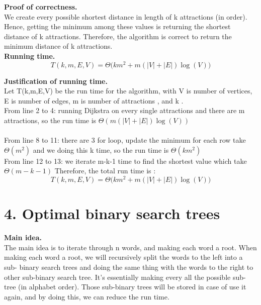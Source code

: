\documentclass[11pt]{article}
\begin{document}
\noindent
\textbf{Proof of correctness.}\\
We create every possible shortest distance in length of k attractions (in order). Hence, getting the minimum among these values is returning the shortest distance of k attractions. Therefore, the algorithm is correct to return the minimum distance of k attractions.\\
\noindent
\textbf{Running time.}
$$\boxed{T(k,m,E,V) = \Theta\Big(km^2 + m(|V| + |E|)\log(V)\Big)}$$

\noindent
\textbf{Justification of running time.}\\
Let T(k,m,E,V) be the run time for the algorithm, with V is number of vertices, E is number of edges, m is number of attractions , and k .\\
From line 2 to 4: running Dijkstra on every single attractions and there are m attractions, so the run time is $\Theta(m(|V| + |E|)\log(V))$\\
\\
From line 8 to 11: there are 3 for loop, update the minimum for each row take $\Theta(m^2)$ and we doing this k time, so the run time is $\Theta(km^2)$\\
From line 12 to 13: we iterate m-k-1 time to find the shortest value which take $\Theta(m-k- 1)$
Therefore, the total run time is :\\
$$\boxed{T(k,m,E,V) = \Theta\Big(km^2 + m(|V| + |E|)\log(V)\Big)}$$


\newpage
\section*{4. Optimal binary search trees}
\noindent
\textbf{Main idea.}\\
The main idea is to iterate through n words, and making each word a root. When making each word a root, we will recursively split the words to the left into a sub- binary search trees and doing the same thing with the words to the right to other sub-binary search tree. It's essentially making every all the possible sub-tree (in alphabet order). Those sub-binary trees will be stored in case of use it again, and by doing this, we can reduce the run time. \\
\end{document}

